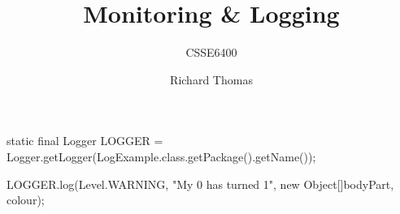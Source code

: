 \documentclass{slide}
\title{Monitoring \& Logging}
\subtitle{CSSE6400}
\author{Richard Thomas}
\date{\week{9}}
\begin{document}
\maketitle


\begin{code}[language=java]{}
static final Logger LOGGER =
        Logger.getLogger(LogExample.class.getPackage().getName());

LOGGER.log(Level.WARNING, "My {0} has turned {1}",
            new Object[]{bodyPart, colour});
\end{code}

\end{document}
